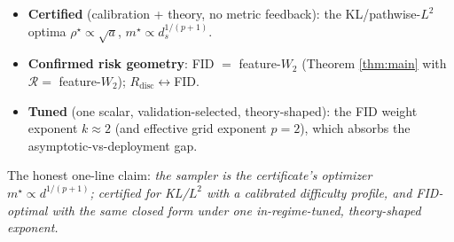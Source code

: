 \documentclass[11pt]{article}
\newcommand{\R}{\mathcal R}
\begin{document}
\begin{itemize}
\item \textbf{Certified} (calibration + theory, no metric feedback): the
KL/pathwise-$L^2$ optima $\rho^\star\propto\sqrt a$,
$m^\star\propto d_s^{1/(p+1)}$.
\item \textbf{Confirmed risk geometry}: FID $=$ feature-$W_2$ (Theorem
\ref{thm:main} with $\R=$ feature-$W_2$); $R_{\mathrm{disc}}\!\leftrightarrow\!$FID.
\item \textbf{Tuned} (one scalar, validation-selected, theory-shaped):
the FID weight exponent $k\approx2$ (and effective grid exponent $p=2$),
which absorbs the asymptotic-vs-deployment gap.
\end{itemize}
The honest one-line claim: \emph{the sampler is the certificate's optimizer
$m^\star\propto d^{1/(p+1)}$; certified for KL/$L^2$ with a calibrated
difficulty profile, and FID-optimal with the same closed form under one
in-regime-tuned, theory-shaped exponent.}
\end{document}

